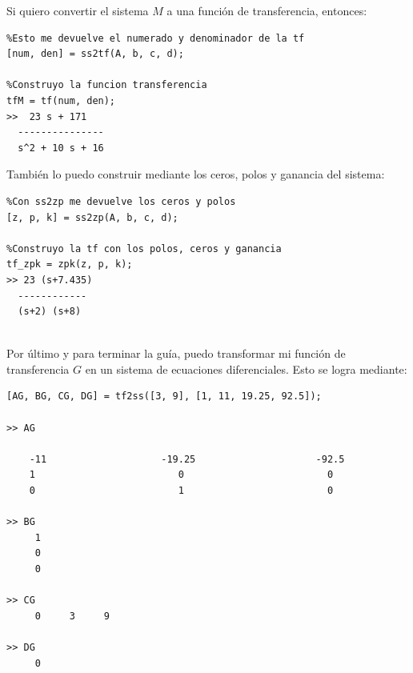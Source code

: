 Si quiero convertir el sistema $M$ a una función de transferencia, entonces:

\begin{lstlisting}
%Esto me devuelve el numerado y denominador de la tf
[num, den] = ss2tf(A, b, c, d);

%Construyo la funcion transferencia
tfM = tf(num, den);
>>  23 s + 171
  ---------------
  s^2 + 10 s + 16
\end{lstlisting}


También lo puedo construir mediante los ceros, polos y ganancia del sistema:

\begin{lstlisting}
%Con ss2zp me devuelve los ceros y polos
[z, p, k] = ss2zp(A, b, c, d);

%Construyo la tf con los polos, ceros y ganancia
tf_zpk = zpk(z, p, k);
>> 23 (s+7.435)
  ------------
  (s+2) (s+8)
 
\end{lstlisting}


Por último y para terminar la guía, puedo transformar mi función de transferencia $G$ en un sistema de ecuaciones diferenciales. Esto se logra mediante:


\begin{lstlisting}
[AG, BG, CG, DG] = tf2ss([3, 9], [1, 11, 19.25, 92.5]); 

>> AG

    -11                    -19.25                     -92.5
    1                         0                         0
    0                         1                         0

>> BG 
     1
     0
     0

>> CG
     0     3     9

>> DG 
     0
\end{lstlisting}